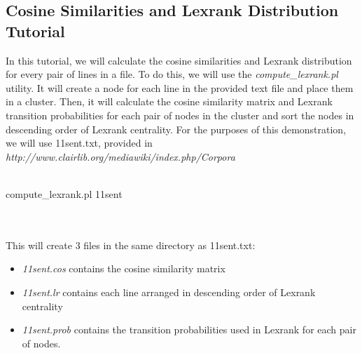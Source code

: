 \subsection{Cosine Similarities and Lexrank Distribution Tutorial}
In this tutorial, we will calculate the cosine similarities and Lexrank distribution for every pair of lines in a file. To do this, we will use the \emph{compute\_lexrank.pl} utility. It will create a node for each line in the provided text file and place them in a cluster. Then, it will calculate the cosine similarity matrix and Lexrank transition probabilities for each pair of nodes in the cluster and sort the nodes in descending order of Lexrank centrality. For the purposes of this demonstration, we will use 11sent.txt, provided in \emph{http://www.clairlib.org/mediawiki/index.php/Corpora}
\\
\\
\begin{boxedverbatim}
compute_lexrank.pl 11sent
\end{boxedverbatim}
\\
\\
This will create 3 files in the same directory as 11sent.txt:
\begin{itemize}
  \item \emph{11sent.cos} contains the cosine similarity matrix
  \item \emph{11sent.lr} contains each line arranged in descending order of Lexrank centrality
  \item \emph{11sent.prob} contains the transition probabilities used in Lexrank for each pair of nodes.
\end{itemize}

